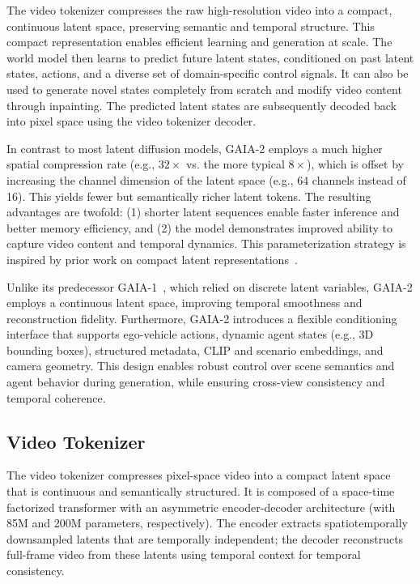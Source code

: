 The video tokenizer compresses the raw high-resolution video into a compact, continuous latent space, preserving semantic and temporal structure. This compact representation enables efficient learning and generation at scale. The world model then learns to predict future latent states, conditioned on past latent states, actions, and a diverse set of domain-specific control signals. It can also be used to generate novel states completely from scratch and modify video content through inpainting. The predicted latent states are subsequently decoded back into pixel space using the video tokenizer decoder.

In contrast to most latent diffusion models, GAIA-2 employs a much higher spatial compression rate (e.g., $32\times$ vs. the more typical $8\times$), which is offset by increasing the channel dimension of the latent space (e.g., 64 channels instead of 16). This yields fewer but semantically richer latent tokens. The resulting advantages are twofold: (1) shorter latent sequences enable faster inference and better memory efficiency, and (2) the model demonstrates improved ability to capture video content and temporal dynamics. This parameterization strategy is inspired by prior work on compact latent representations~\cite{dcae,ltx}.

Unlike its predecessor GAIA-1~\cite{gaia1-2023}, which relied on discrete latent variables, GAIA-2 employs a continuous latent space, improving temporal smoothness and reconstruction fidelity. Furthermore, GAIA-2 introduces a flexible conditioning interface that supports ego-vehicle actions, dynamic agent states (e.g., 3D bounding boxes), structured metadata, CLIP and scenario embeddings, and camera geometry. This design enables robust control over scene semantics and agent behavior during generation, while ensuring cross-view consistency and temporal coherence.


\subsection{Video Tokenizer}

The video tokenizer compresses pixel-space video into a compact latent space that is continuous and semantically structured. It is composed of a space-time factorized transformer with an asymmetric encoder-decoder architecture (with 85M and 200M parameters, respectively). The encoder extracts spatiotemporally downsampled latents that are temporally independent; the decoder reconstructs full-frame video from these latents using temporal context for temporal consistency. 

